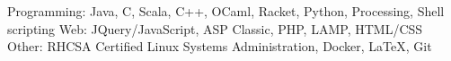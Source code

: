 \begin{cvskills}
    \cvskill
    {Programming:}
    {Java, C, Scala, C++, OCaml, Racket, Python, Processing, Shell scripting}
	\cvskill
	{Web:}
	{JQuery/JavaScript, ASP Classic, PHP, LAMP, HTML/CSS}
	\cvskill
	{Other:}
	{RHCSA Certified Linux Systems Administration, Docker, LaTeX, Git}
	\vspace{-1.5em} %
\end{cvskills}

